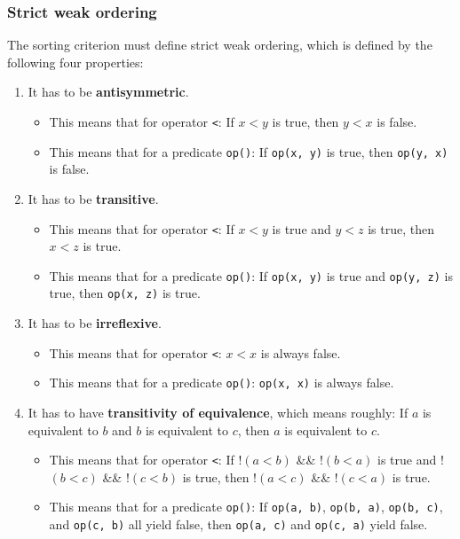 \documentclass{report}
\begin{document}
   \subsubsection{Strict weak ordering}
   \bigbreak \noindent \bigbreak \noindent 
   The sorting criterion must define strict weak ordering, which is defined by the following four properties:
   \begin{enumerate}
       \item It has to be \textbf{antisymmetric}.
           \begin{itemize}
               \item This means that for operator \texttt{<}: If $x < y$ is true, then $y < x$ is false.
               \item This means that for a predicate \texttt{op()}: If \texttt{op(x, y)} is true, then \texttt{op(y, x)} is false.
           \end{itemize}

       \item It has to be \textbf{transitive}.
           \begin{itemize}
               \item This means that for operator \texttt{<}: If $x < y$ is true and $y < z$ is true, then $x < z$ is true.
               \item This means that for a predicate \texttt{op()}: If \texttt{op(x, y)} is true and \texttt{op(y, z)} is true, then \texttt{op(x, z)} is true.
           \end{itemize}

       \item It has to be \textbf{irreflexive}.
           \begin{itemize}
               \item This means that for operator \texttt{<}: $x < x$ is always false.
               \item This means that for a predicate \texttt{op()}: \texttt{op(x, x)} is always false.
           \end{itemize}

       \item It has to have \textbf{transitivity of equivalence}, which means roughly: If $a$ is equivalent to $b$ and $b$ is equivalent to $c$, then $a$ is equivalent to $c$.
           \begin{itemize}
               \item This means that for operator \texttt{<}: If !$(a < b)$ \&\& !$(b < a)$ is true and !$(b < c)$ \&\& !$(c < b)$ is true, then !$(a < c)$ \&\& !$(c < a)$ is true.
               \item This means that for a predicate \texttt{op()}: If \texttt{op(a, b)}, \texttt{op(b, a)}, \texttt{op(b, c)}, and \texttt{op(c, b)} all yield false, then \texttt{op(a, c)} and \texttt{op(c, a)} yield false.
           \end{itemize}
   \end{enumerate}
\end{document}
